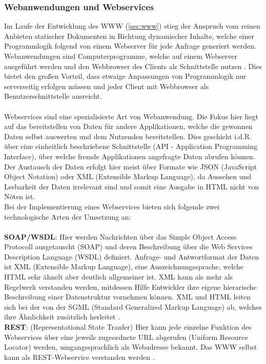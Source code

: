 \subsubsection{Webanwendungen und Webservices}\label{sec:webanwenservices}
Im Laufe der Entwicklung des WWW (\ref{sec:www}) stieg der Anspruch vom reinen Anbieten statischer Dokumenten in Richtung dynamischer Inhalte, welche einer Programmlogik folgend von einem Webserver für jede Anfrage generiert werden. Webanwendungen sind Computerprogramme, welche auf einem Webserver ausgeführt werden und den Webbrowser des Clients als Schnittstelle nutzen \cite{safran2011webtechnologien:article}. Dies bietet den großen Vorteil, dass etwaige Anpassungen von Programmlogik nur serverseitig erfolgen müssen und jeder Client mit Webbrowser als Benutzerschnittstelle ausreicht. \\ \\
Webservices sind eine spezialisierte Art von Webanwendung. Die Fokus hier liegt auf das bereitstellen von Daten für andere Applikationen, welche die gewonnen Daten selbst auswerten und dem Nutzenden bereitstellen. Dies geschieht i.d.R. über eine einheitlich beschriebene Schnittstelle (API - Application Programming Interface), über welche fremde Applikationen angefragte Daten abrufen können. Der Austausch der Daten erfolgt hier meist über Formate wie JSON (JavaScript Object Notation) oder XML (Extensible Markup Language), da Aussehen und Lesbarkeit der Daten irrelevant sind und somit eine Ausgabe in HTML nicht von Nöten ist. \\
Bei der Implementierung eines Webservices bieten sich folgende zwei technologische Arten der Umsetzung an: \\ \\
\textbf{SOAP/WSDL}: Hier werden Nachrichten über das Simple Object Access Protocoll ausgetauscht (SOAP) und deren Beschreibung über die Web Services Description Language (WSDL) definiert. Anfrage- und Antwortformat der Daten ist XML (Extensible Markup Language), eine Auszeichnungssprache, welche HTML sehr ähnelt aber deutlich allgemeiner ist. XML kann als mehr als Regelwerk verstanden werden, mitdessen Hilfe Entwickler ihre eigene hierarische Beschreibung einer Datenstruktur vornehmen können. XML und HTML leiten sich bei der von der SGML (Standard Generalized Markup Language) ab, welches ihre Ähnlichkeit zusätzlich herleitet \cite{XMLHTMLU88:online}. \\

 
\textbf{REST}: (Representational State Tranfer) Hier kann jede einzelne Funktion des Webservices über eine jeweils zugeordnete URL abgerufen (Uniform Resource Locator) werden, umgangssprachlich als Webadresse bekannt. Das WWW selbst kann als REST-Webservice verstanden werden \cite{Bayer2002:online}. \\ 

